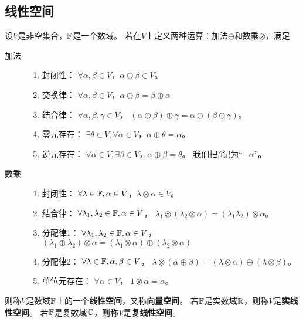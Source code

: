 \subsection{线性空间}
\begin{definition}[线性空间] \label{def:linear-space}
  设$V$是非空集合，$\mathbb{F}$是一个数域。
  若在$V$上定义两种运算：加法$\oplus$和数乘$\otimes$，满足
  \begin{description}
    \item[加法]
    \begin{enumerate}
      \item 封闭性：
      $\forall\alpha,\beta\in V$，$\alpha\oplus\beta\in V$。
      \item 交换律：
      $\forall\alpha,\beta\in V$，$\alpha\oplus\beta = \beta\oplus\alpha$
      \item 结合律：
      $\forall\alpha,\beta,\gamma\in V$，
      $(\alpha\oplus\beta)\oplus\gamma = \alpha\oplus(\beta\oplus\gamma)$。
      \item 零元存在：
      $\exists\theta\in V,\forall\alpha\in V$，$\alpha\oplus\theta=\alpha$。
      \item 逆元存在：
      $\forall\alpha\in V,\exists\beta\in V$，$\alpha\oplus\beta=\theta$。
      我们把$\beta$记为``$-\alpha$''。
    \end{enumerate}
    \item[数乘]
    \begin{enumerate}
      \item 封闭性：
      $\forall\lambda\in\mathbb{F},\alpha\in V$，$\lambda\otimes\alpha\in V$。
      \item 结合律：
      $\forall\lambda_1,\lambda_2\in\mathbb{F},\alpha\in V$，
      $\lambda_1\otimes(\lambda_2\otimes\alpha) =
        (\lambda_1\lambda_2)\otimes\alpha$。
      \item 分配律1：
      $\forall\lambda_1,\lambda_2\in\mathbb{F},\alpha\in V$，
      $(\lambda_1\oplus\lambda_2)\otimes\alpha =
        (\lambda_1\otimes\alpha)\oplus(\lambda_2\otimes\alpha)$
      \item 分配律2：
      $\forall\lambda\in\mathbb{F},\alpha,\beta\in V$，
      $\lambda\otimes(\alpha\oplus\beta) =
        (\lambda\otimes\alpha)\oplus(\lambda\otimes\beta)$。
      \item 单位元存在：
      $\forall\alpha\in V$，
      $1\otimes\alpha = \alpha$。
    \end{enumerate}
  \end{description}
  则称$V$是数域$\mathbb{F}$上的一个\textbf{线性空间}，又称\textbf{向量空间}。
  若$\mathbb{F}$是实数域$\mathbb{R}$，则称$V$是\textbf{实线性空间}。
  若$\mathbb{F}$是复数域$\mathbb{C}$，则称$V$是\textbf{复线性空间}。
\end{definition}

